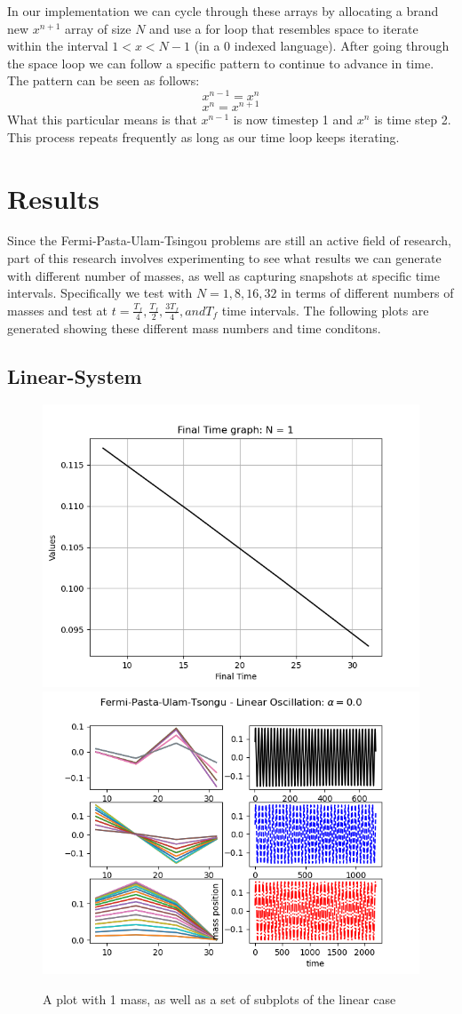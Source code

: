 In our implementation we can cycle through these arrays by allocating a brand new $x^{n+1}$ array of size $N$ and use a for loop that resembles space to iterate within the interval $1 < x < N-1$ (in a 0 indexed language). After going through the space loop we can follow a specific pattern to continue to advance in time. The pattern can be seen as follows: $$ x^{n-1} = x^{n}$$ $$x^{n} = x^{n+1} $$What this particular means is that $x^{n-1}$ is now timestep 1 and $x^{n}$ is time step 2. This process repeats frequently as long as our time loop keeps iterating.  

\section{Results}
Since the Fermi-Pasta-Ulam-Tsingou problems are still an active field of research, part of this research involves experimenting to see what results we can generate with different number of masses, as well as capturing snapshots at specific time intervals. Specifically we test with $N = {1,8,16,32}$ in terms of different numbers of masses and test at $t=\frac{T_{f}}{4},\frac{T_{f}}{2}, \frac{3T_{f}}{4}, and T_{f}$ time intervals. The following plots are generated showing these different mass numbers and time conditons.

\subsection{Linear-System}

\begin{figure}[h]
\includegraphics[width=.5\textwidth]{figures/n1mass.png}
\includegraphics[width=.5\textwidth]{figures/FPUT1.png}
\caption{A plot with 1 mass, as well as a set of subplots of the linear case}
\end{figure}


